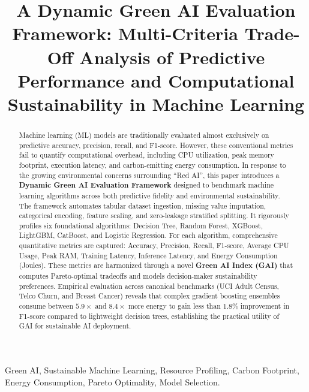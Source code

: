 \documentclass[conference]{IEEEtran}
\begin{document}
\title{A Dynamic Green AI Evaluation Framework: Multi-Criteria Trade-Off Analysis of Predictive Performance and Computational Sustainability in Machine Learning}

\author{
}

\maketitle

\begin{abstract}
Machine learning (ML) models are traditionally evaluated almost exclusively on predictive accuracy, precision, recall, and F1-score. However, these conventional metrics fail to quantify computational overhead, including CPU utilization, peak memory footprint, execution latency, and carbon-emitting energy consumption. In response to the growing environmental concerns surrounding ``Red AI'', this paper introduces a \textbf{Dynamic Green AI Evaluation Framework} designed to benchmark machine learning algorithms across both predictive fidelity and environmental sustainability. The framework automates tabular dataset ingestion, missing value imputation, categorical encoding, feature scaling, and zero-leakage stratified splitting. It rigorously profiles six foundational algorithms: Decision Tree, Random Forest, XGBoost, LightGBM, CatBoost, and Logistic Regression. For each algorithm, comprehensive quantitative metrics are captured: Accuracy, Precision, Recall, F1-score, Average CPU Usage, Peak RAM, Training Latency, Inference Latency, and Energy Consumption (Joules). These metrics are harmonized through a novel \textbf{Green AI Index (GAI)} that computes Pareto-optimal tradeoffs and models decision-maker sustainability preferences. Empirical evaluation across canonical benchmarks (UCI Adult Census, Telco Churn, and Breast Cancer) reveals that complex gradient boosting ensembles consume between $5.9\times$ and $8.4\times$ more energy to gain less than $1.8\%$ improvement in F1-score compared to lightweight decision trees, establishing the practical utility of GAI for sustainable AI deployment.
\end{abstract}

\begin{IEEEkeywords}
Green AI, Sustainable Machine Learning, Resource Profiling, Carbon Footprint, Energy Consumption, Pareto Optimality, Model Selection.
\end{IEEEkeywords}
\end{document}
